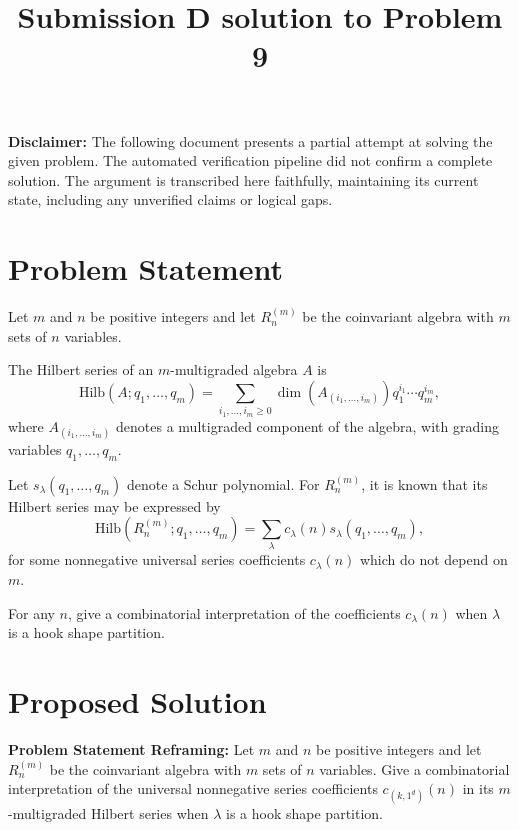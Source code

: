 \documentclass[12pt]{article}
\begin{document}
\title{Submission D solution to Problem 9}
\date{}
\maketitle


\begin{center}
    \textbf{Disclaimer:} The following document presents a partial attempt at solving the given problem. The automated verification pipeline did not confirm a complete solution. The argument is transcribed here faithfully, maintaining its current state, including any unverified claims or logical gaps.
\end{center}

\section*{Problem Statement}

Let $m$ and $n$ be positive integers and let $R_n^{(m)}$ be the coinvariant algebra with $m$ sets of $n$ variables.

The Hilbert series of an $m$-multigraded algebra $A$ is
\[
\mathrm{Hilb}(A;q_1,\ldots ,q_m)= \sum_{i_1,\ldots,i_m \geq 0} \dim(A_{(i_1,\ldots,i_m)})q_1^{i_1} \cdots q_m^{i_m},
\]
where $A_{(i_1,\ldots,i_m)}$ denotes a multigraded component of the algebra, with grading variables $q_1,\ldots, q_m$.

Let $s_\lambda(q_1,\ldots ,q_m)$ denote a Schur polynomial. For $R_n^{(m)}$, it is known that its Hilbert series may be expressed by 
\[
\mathrm{Hilb}(R_n^{(m)};q_1,\ldots ,q_m)= \sum_{\lambda}
c_{\lambda}(n)s_\lambda(q_1,\ldots ,q_m),
\]
for some nonnegative universal series coefficients $c_\lambda(n)$ which do not depend on $m$.

For any $n$, give a combinatorial interpretation of the coefficients $c_{\lambda}(n)$ when $\lambda$ is a hook shape partition.

\section*{Proposed Solution}

\textbf{Problem Statement Reframing:} Let $m$ and $n$ be positive integers and let $R_n^{(m)}$ be the coinvariant algebra with $m$ sets of $n$ variables. Give a combinatorial interpretation of the universal nonnegative series coefficients $c_{(k, 1^d)}(n)$ in its $m$-multigraded Hilbert series when $\lambda$ is a hook shape partition.
\end{document}
